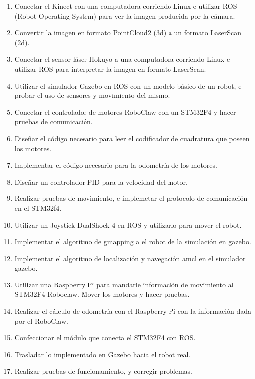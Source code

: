 \begin{enumerate}  %
    \item Conectar el Kinect con una computadora corriendo Linux e utilizar ROS (Robot Operating System) para ver la imagen producida por la cámara. 
    \item Convertir la imagen en formato PointCloud2 (3d) a un formato LaserScan (2d).
    \item Conectar el sensor láser Hokuyo a una computadora corriendo Linux e utilizar ROS para interpretar la imagen en formato LaserScan.
    \item Utilizar el simulador Gazebo en ROS con un modelo básico de un robot, e probar el uso de sensores y movimiento del mismo.
    \item Conectar el controlador de motores RoboClaw con un STM32F4 y hacer pruebas de comunicación.
    \item Diseñar el código necesario para leer el codificador de cuadratura que poseen los motores.
    \item Implementar el código necesario para la odometría de los motores.
    \item Diseñar un controlador PID para la velocidad del motor.
    \item Realizar pruebas de movimiento, e implemetar el protocolo de comunicación en el STM32f4.
    \item Utilizar un Joystick DualShock 4 en ROS y utilizarlo para mover el robot.
    \item Implementar el algoritmo de gmapping a el robot de la simulación en gazebo. 
    \item Implementar el algoritmo de localización y navegación amcl en el simulador gazebo. 
    \item Utilizar una Raspberry Pi para mandarle información de movimiento al STM32F4-Roboclaw. Mover los motores y hacer pruebas. 
    \item Realizar el cálculo de odometría con el Raspberry Pi con la información dada por el RoboClaw. 
    \item Confeccionar el módulo que conecta el STM32F4 con ROS.
    \item Trasladar lo implementado en Gazebo hacia el robot real.
    \item Realizar pruebas de funcionamiento, y corregir problemas.
\end{enumerate}

